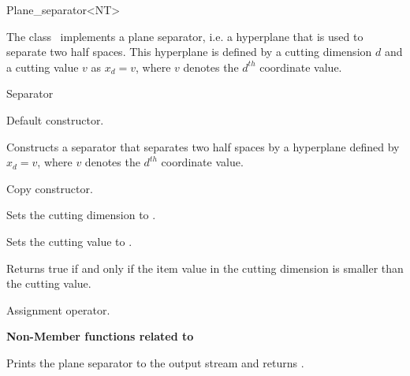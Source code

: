 

\begin{ccRefClass}{Plane_separator<NT>}  %


\ccDefinition
  
The class \ccRefName\ implements a plane separator, i.e. a hyperplane that is used to separate two half spaces.
This hyperplane is defined by a cutting dimension $d$ and a cutting value $v$
as $x_d=v$, where $v$ denotes the $d^{th}$ coordinate value.


\ccIsModel

Separator

\ccCreation
{}  %

{Default constructor.}

{Constructs a separator that separates two half spaces by a hyperplane
defined by $x_d=v$, where $v$ denotes the $d^{th}$ coordinate value.}

{Copy constructor.}


{Sets the cutting dimension to . }

{Sets the cutting value to . }



{Returns true if and only if the item value in the cutting dimension is smaller than the cutting value.}

{Assignment operator.}

{\bf Non-Member functions related to }

\ccGlueBegin
{}
{Prints the plane separator  to the output stream  and returns .}
\ccGlueEnd



\end{ccRefClass}


